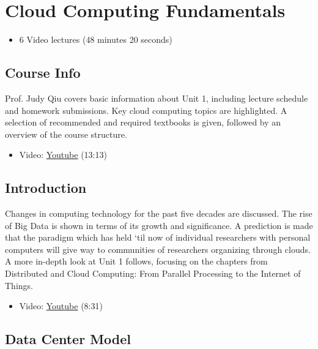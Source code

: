 \FILENAME

\section{Cloud Computing
Fundamentals}\label{cloud-computing-fundamentals}

\begin{itemize}
\tightlist
\item
  6 Video lectures (48 minutes 20 seconds)
\end{itemize}

\subsection{Course Info}\label{course-info}

Prof. Judy Qiu covers basic information about Unit 1, including lecture
schedule and homework submissions. Key cloud computing topics are
highlighted. A selection of recommended and required textbooks is given,
followed by an overview of the course structure.

\begin{itemize}
\tightlist
\item
  Video: \href{https://www.youtube.com/watch?v=Kde5YVUwDTQ}{Youtube}
  (13:13)
\end{itemize}

\subsection{Introduction}\label{introduction}

Changes in computing technology for the past five decades are discussed.
The rise of Big Data is shown in terms of its growth and significance. A
prediction is made that the paradigm which has held `til now of
individual researchers with personal computers will give way to
communities of researchers organizing through clouds. A more in-depth
look at Unit 1 follows, focusing on the chapters from Distributed and
Cloud Computing: From Parallel Processing to the Internet of Things.

\begin{itemize}
\tightlist
\item
  Video: \href{https://www.youtube.com/watch?v=5lKj8_nqj9k}{Youtube}
  (8:31)
\end{itemize}

\subsection{Data Center Model}\label{data-center-model}

